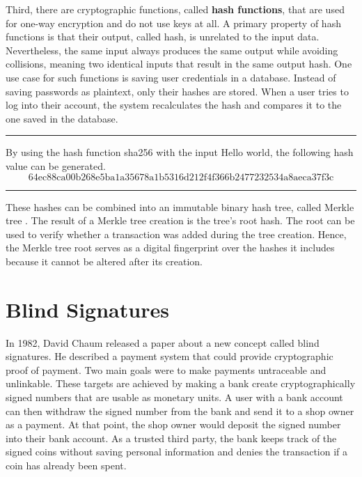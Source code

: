 Third, there are cryptographic functions, called \textbf{hash functions}, that are used for one-way encryption and do not use keys at all.
A primary property of hash functions is that their output, called hash, is unrelated to the input data.
Nevertheless, the same input always produces the same output while avoiding collisions, meaning two identical inputs that result in the same output hash.
One use case for such functions is saving user credentials in a database.
Instead of saving passwords as plaintext, only their hashes are stored.
When a user tries to log into their account, the system recalculates the hash and compares it to the one saved in the database.
\cite{genccouglu2019importance}

\hrule
By using the hash function sha256 with the input Hello world, the following hash value can be generated.
\vspace{4pt}
\begin{equation}
    \textrm{64ec88ca00b268e5ba1a35678a1b5316d212f4f366b2477232534a8aeca37f3c}
\end{equation}

\hrule
\vspace{4pt}

These hashes can be combined into an immutable binary hash tree, called Merkle tree \cite{merkle_tree}.
The result of a Merkle tree creation is the tree's root hash.
The root can be used to verify whether a transaction was added during the tree creation.
Hence, the Merkle tree root serves as a digital fingerprint over the hashes it includes because it cannot be altered after its creation.

\section{Blind Signatures}

In 1982, David Chaum released a paper about a new concept called blind signatures.
He described a payment system that could provide cryptographic proof of payment.
Two main goals were to make payments untraceable and unlinkable.
These targets are achieved by making a bank create cryptographically signed numbers that are usable as monetary units.
A user with a bank account can then withdraw the signed number from the bank and send it to a shop owner as a payment.
At that point, the shop owner would deposit the signed number into their bank account.
As a trusted third party, the bank keeps track of the signed coins without saving personal information and denies the transaction if a coin has already been spent. \cite{chaum1983}

